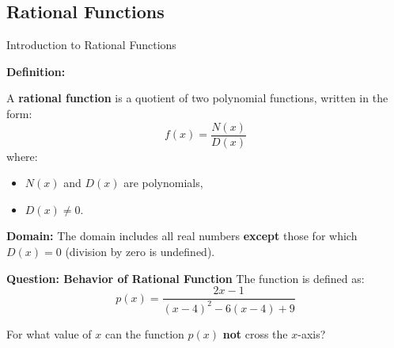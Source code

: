 \documentclass{beamer}
\begin{document}
\begin{frame}
\section{Rational Functions}
\end{frame}

\begin{frame}{Introduction to Rational Functions}
\small

\textbf{Definition:}

A \textbf{rational function} is a quotient of two polynomial functions, written in the form:
\[
f(x) = \frac{N(x)}{D(x)}
\]
where:
\begin{itemize}
    \item $N(x)$ and $D(x)$ are polynomials,
    \item $D(x) \ne 0$.
\end{itemize}

\vspace{0.2cm}
\textbf{Domain:}  
The domain includes all real numbers \textbf{except} those for which $D(x) = 0$ (division by zero is undefined).

\end{frame}


\begin{frame}{\textbf{Question: Behavior of Rational Function}}
The function is defined as:
\[
p(x) = \frac{2x - 1}{(x - 4)^2 - 6(x - 4) + 9}
\]

For what value of \( x \) can the function \( p(x) \) \textbf{not} cross the \( x \)-axis?
\end{frame}
\end{document}
